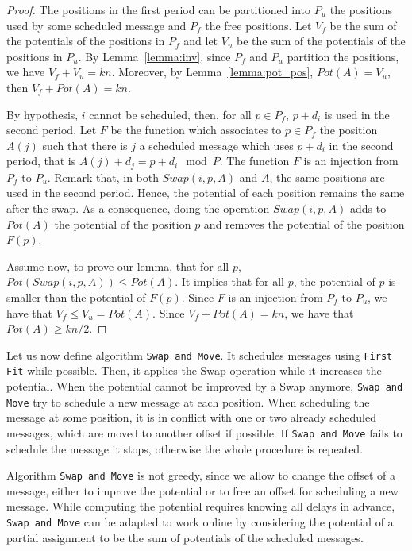 \documentclass[a4paper,UKenglish,cleveref, autoref, thm-restate]{lipics-v2019}
\newcommand\firstfit{\texttt{First Fit}\xspace}
\newcommand\swapandmove{\texttt{Swap and Move}\xspace}
\begin{document}
\begin{proof}
The positions in the first period can be partitioned into $P_{u}$ the positions used by some scheduled message and $P_{f}$ the free positions.
Let $V_f$ be the sum of the potentials of the positions in $P_f$ and let $V_u$ be the sum of the potentials of the positions in $P_u$. By Lemma~\ref{lemma:inv}, since $P_f$ and $P_u$ partition the positions, we have $V_f + V_u = kn$. Moreover, by Lemma~\ref{lemma:pot_pos}, $Pot(A) = V_u$, then $V_f + Pot(A) = kn$.

By hypothesis, $i$ cannot be scheduled, then, for all $p \in P_{f}$, $p+d_i$ is used in the second period. Let $F$ be the function which associates to $p \in P_{f}$ the position $A(j)$ such that there is $j$ a scheduled message which uses $p+d_i$ in the second period, that is $A(j) + d_j = p + d_i \mod P$. The function $F$ is an injection from $P_{f}$ to $P_u$. Remark that, in both $Swap(i,p,A)$ and $A$, the same positions are used in the second period. Hence, the potential of each position remains the same after the swap. As a consequence, doing the operation $Swap(i,p,A)$ adds to $Pot(A)$ the potential of the position $p$ and removes the potential of the position $F(p)$. 

Assume now, to prove our lemma, that for all $p$, $Pot(Swap(i,p,A)) \leq Pot(A)$. It implies that for all $p$, the potential of $p$ is smaller than the potential of $F(p)$. Since $F$ is an injection from $P_f$ to $P_u$, we have that $V_f \leq V_u = Pot(A)$. Since $V_f + Pot(A) = kn$, we have that $Pot(A) \geq kn/2$.
\end{proof}

Let us now define algorithm \swapandmove. 
It schedules messages using \firstfit while possible. Then, it applies the Swap operation while it increases the potential. When the potential cannot be improved by a Swap anymore, \swapandmove try to schedule a new message at each position. When scheduling the message at some position, it is in conflict with one or two already scheduled messages, which are moved to another offset if possible. If \swapandmove fails to schedule the message it stops, otherwise the whole procedure is repeated. 

Algorithm \swapandmove is not greedy, since we allow to change the offset of a message, either to improve the potential or to free an offset for scheduling a new message. While computing the potential requires knowing all delays in advance, \swapandmove can be adapted to work online by considering the potential of a partial assignment to be the sum of potentials of the scheduled messages.
\end{document}
